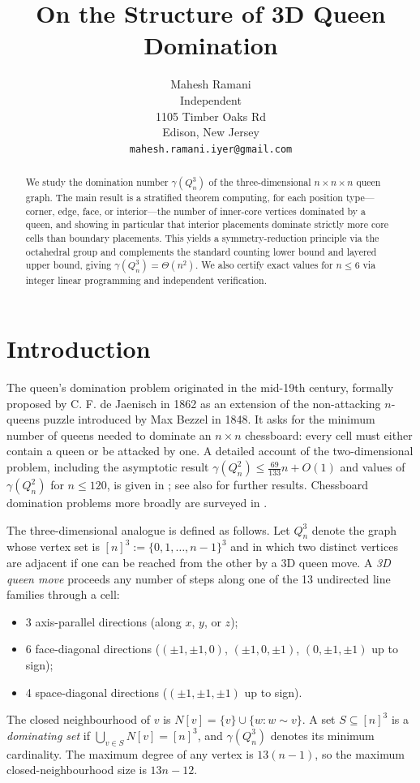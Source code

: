 \documentclass[11pt]{article}
\title{On the Structure of 3D Queen Domination}
\author{
  Mahesh Ramani\\
  Independent\\
  1105 Timber Oaks Rd\\
  Edison, New Jersey\\
  \texttt{mahesh.ramani.iyer@gmail.com}
}
\date{}
\begin{document}
\maketitle

\begin{abstract}
We study the domination number $\gamma(Q^3_n)$ of the three-dimensional
$n\times n\times n$ queen graph. The main result is a stratified theorem
computing, for each position type---corner, edge, face, or interior---the
number of inner-core vertices dominated by a queen, and showing in particular
that interior placements dominate strictly more core cells than boundary
placements. This yields a symmetry-reduction principle via the
octahedral group and complements the standard counting lower bound and layered
upper bound, giving $\gamma(Q^3_n)=\Theta(n^2)$. We also certify exact values
for $n\le 6$ via integer linear programming and independent verification.
\end{abstract}
\section{Introduction}

The queen's domination problem originated in the mid-19th century, formally proposed by C. F. de Jaenisch in 1862 as an extension of the non-attacking $n$-queens puzzle introduced by Max Bezzel in 1848. It asks for the minimum number of queens needed
to dominate an $n \times n$ chessboard: every cell must either contain a queen
or be attacked by one. A detailed account of the two-dimensional problem,
including the asymptotic result $\gamma(Q^2_n) \leq \tfrac{69}{133}n + O(1)$
and values of $\gamma(Q^2_n)$ for $n \leq 120$, is given in
\cite{osterCardWeakley}; see also \cite{weakley2022, finozhenok2007} for further
results. Chessboard domination problems more broadly are surveyed in
\cite{cockayne1990}.

The three-dimensional analogue is defined as follows. Let $Q^3_n$ denote the
graph whose vertex set is $[n]^3 := \{0,1,\ldots,n-1\}^3$ and in which two
distinct vertices are adjacent if one can be reached from the other by a 3D queen
move. A \emph{3D queen move} proceeds any number of steps along one of the 13
undirected line families through a cell:
\begin{itemize}
  \item 3 axis-parallel directions (along $x$, $y$, or $z$);
  \item 6 face-diagonal directions ($(\pm1,\pm1,0)$, $(\pm1,0,\pm1)$,
        $(0,\pm1,\pm1)$ up to sign);
  \item 4 space-diagonal directions ($(\pm1,\pm1,\pm1)$ up to sign).
\end{itemize}
The closed neighbourhood of $v$ is $N[v] = \{v\} \cup \{w : w \sim v\}$.
A set $S \subseteq [n]^3$ is a \emph{dominating set} if
$\bigcup_{v \in S} N[v] = [n]^3$, and $\gamma(Q^3_n)$ denotes its minimum
cardinality. The maximum degree of any vertex is $13(n-1)$, so the maximum
closed-neighbourhood size is $13n-12$.
\end{document}
